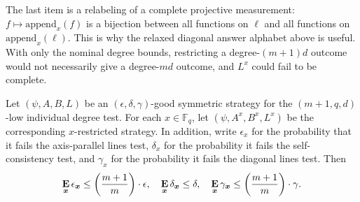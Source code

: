 \documentclass[11pt]{article}
\theoremstyle{definition}
\newcommand{\E}{\mathop{\bf E\/}}
\newcommand{\F}{\mathbb F}
\newcommand{\eps}{\epsilon}
\newcommand{\bx}{{\boldsymbol{x}}}
\begin{document}
The last item is a relabeling of a complete projective measurement:
$f\mapsto\mathrm{append}_x(f)$ is a bijection between all functions on
$\ell$ and all functions on $\mathrm{append}_x(\ell)$.  This is why the
relaxed diagonal answer alphabet above is useful.  With only the
nominal degree bounds, restricting a degree-$(m+1)d$ outcome would not
necessarily give a degree-$md$ outcome, and $L^x$ could fail to be
complete.

\begin{lemma}\label{lem:restricted-probabilities}
Let $(\psi, A, B, L)$ be an $(\eps, \delta, \gamma)$-good symmetric strategy
		for the $(m+1,q,d)$-low individual degree test.
For each $x \in \F_q$, let $(\psi, A^x, B^x, L^x)$ be the corresponding $x$-restricted strategy.
In addition, write $\eps_x$ for the probability that it fails the axis-parallel lines test,
$\delta_x$ for the probability it fails the self-consistency test,
and $\gamma_x$ for the probability it fails the diagonal lines test.
Then
\begin{equation*}
\E_{\bx} \eps_{\bx} \leq \left(\frac{m+1}{m}\right) \cdot\eps,
\quad
\E_{\bx} \delta_{\bx} \leq  \delta,
\quad
\E_{\bx} \gamma_{\bx} \leq \left(\frac{m+1}{m}\right) \cdot \gamma.
\end{equation*}
\end{lemma}
\end{document}
